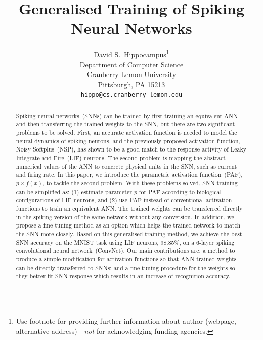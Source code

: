 \documentclass{article}
\title{Generalised Training of Spiking Neural Networks}
\author{
	David S.~Hippocampus\thanks{Use footnote for providing further
		information about author (webpage, alternative
		address)---\emph{not} for acknowledging funding agencies.} \\
	Department of Computer Science\\
	Cranberry-Lemon University\\
	Pittsburgh, PA 15213 \\
	\texttt{hippo@cs.cranberry-lemon.edu} \\
}
\begin{document}
	
	\maketitle
	
	\begin{abstract}
		Spiking neural networks~(SNNs) can be trained by first training an equivalent ANN and then transferring the trained weights to the SNN, but there are two significant problems to be solved.
		First, an accurate activation function is needed to model the neural dynamics of spiking neurons, and the previously proposed activation function, Noisy Softplus~(NSP), has shown to be a good match to the response activity of Leaky Integrate-and-Fire~(LIF) neurons.
		The second problem is mapping the abstract numerical values of the ANN to concrete physical units in the SNN, such as current and firing rate.
		In this paper, we introduce the parametric activation function~(PAF), $p \times f(x)$, to tackle the second problem.
		With these problems solved, SNN training can be simplified as: (1) estimate parameter $p$ for PAF according to biological configurations of LIF neurons, and (2) use PAF instead of conventional activation functions to train an equivalent ANN.
		The trained weights can be transferred directly in the spiking version of the same network without any conversion.
		In addition, we propose a fine tuning method as an option which helps the trained network to match the SNN more closely.
		Based on this generalised training method, we achieve the best SNN accuracy on the MNIST task using LIF neurons, 98.85\%, on a 6-layer spiking convolutional neural network~(ConvNet).
		Our main contributions are: a method to produce a simple modification for activation functions so that ANN-trained weights can be directly transferred to SNNs; and a fine tuning procedure for the weights so they better fit SNN response which results in an increase of recognition accuracy.
		
		
		

\end{abstract}
\end{document}
